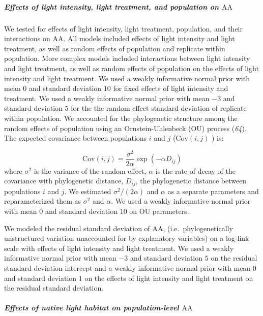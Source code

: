 \documentclass[
  letterpaper,
  DIV=11,
  numbers=noendperiod]{scrartcl}
\let\oldsubparagraph\subparagraph
\renewcommand{\subparagraph}[1]{\oldsubparagraph{#1}\mbox{}}
\newcommand{\aax}{$\mathrm{AA}$}
\begin{document}
\subparagraph{\texorpdfstring{Effects of light intensity, light
treatment, and population on
\aax}{Effects of light intensity, light treatment, and population on }}\label{effects-of-light-intensity-light-treatment-and-population-on}

We tested for effects of light intensity, light treatment, population,
and their interactions on \aax. All models included effects of light
intensity and light treatment, as well as random effects of population
and replicate within population. More complex models included
interactions between light intensity and light treatment, as well as
random effects of population on the effects of light intensity and light
treatment. We used a weakly informative normal prior with mean \(0\) and
standard deviation \(10\) for fixed effects of light intensity and
treatment. We used a weakly informative normal prior with mean \(-3\)
and standard deviation \(5\) for the the random effect standard
deviation of replicate within population. We accounted for the
phylogenetic structure among the random effects of population using an
Ornstein-Uhlenbeck (OU) process (\emph{64}). The expected covariance
between populations \(i\) and \(j\) (\(\text{Cov}(i, j)\) ) is:

\[\text{Cov}(i, j) = \frac{\sigma^2}{2 \alpha} \exp(-\alpha D_{ij})\]
where \(\sigma^2\) is the variance of the random effect, \(\alpha\) is
the rate of decay of the covariance with phylogenetic distance,
\(D_{ij}\), the phylogenetic distance between populations \(i\) and
\(j\). We estimated \(\sigma^2 / (2 \alpha)\) and \(\alpha\) as a
separate parameters and reparameterized them as \(\sigma^2\) and
\(\alpha\). We used a weakly informative normal prior with mean \(0\)
and standard deviation \(10\) on OU parameters.

We modeled the residual standard deviation of \aax,
(i.e.~phylogenetically unstructured variation unaccounted for by
explanatory variables) on a log-link scale with effects of light
intensity and light treatment. We used a weakly informative normal prior
with mean \(-3\) and standard deviation \(5\) on the residual standard
deviation intercept and a weakly informative normal prior with mean
\(0\) and standard deviation \(1\) on the effects of light intensity and
light treatment on the residual standard deviation.

\subparagraph{\texorpdfstring{Effects of native light habitat on
population-level
\aax}{Effects of native light habitat on population-level }}\label{effects-of-native-light-habitat-on-population-level}
\end{document}
